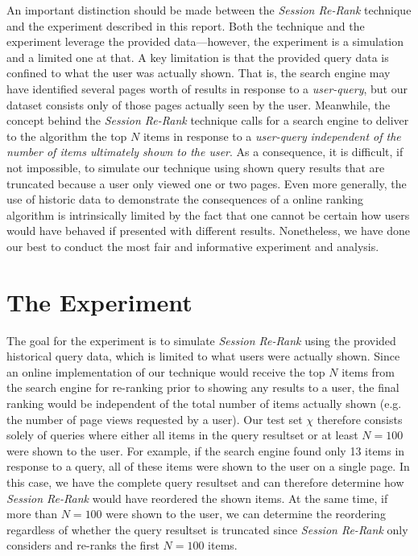 \documentclass{article}
\begin{document}
An important distinction should be made between the {\em Session Re-Rank}
technique and the experiment described in this report. Both the technique and
the experiment leverage the provided data---however, the experiment is
a simulation and a limited one at that. A key limitation is that the provided
query data is confined to what the user was actually shown. That is, the search
engine may have identified several pages worth of results in response to a {\em
user-query}, but our dataset consists only of those pages actually seen by the user.
Meanwhile, the concept behind the {\em Session Re-Rank} technique calls for a
search engine to deliver to the algorithm the top $N$ items in response to a
{\em user-query} {\em independent of the number of items ultimately shown to the
user}. As a consequence, it is difficult, if not impossible, to simulate our
technique using shown query results that are truncated because a user only
viewed one or two pages.  Even more generally, the use of historic data to
demonstrate the consequences of a online ranking algorithm is intrinsically
limited by the fact that one cannot be certain how users would have behaved if
presented with different results. Nonetheless, we have done our best to conduct
the most fair and informative experiment and analysis.

\section{The Experiment}

The goal for the experiment is to simulate {\em Session Re-Rank} using the
provided historical query data, which is limited to what users were actually
shown. Since an online implementation of our technique would receive the top $N$
items from the search engine for re-ranking prior to showing any results to a
user, the final ranking would be independent of the total number of items
actually shown (e.g. the number of page views requested by a user). Our test 
set $\chi$ therefore consists solely of queries where either all items in the
query resultset or at least $N=100$ were shown to the user. For example, if
the search engine found only 13 items in response to a query, all of these
items were shown to the user on a single page. In this case, we have the
complete query resultset and can therefore determine how {\em Session Re-Rank}
would have reordered the shown items. At the same time, if more than $N=100$
were shown to the user, we can determine the reordering regardless of whether
the query resultset is truncated since {\em Session Re-Rank} only considers
and re-ranks the first $N=100$ items.
\end{document}
